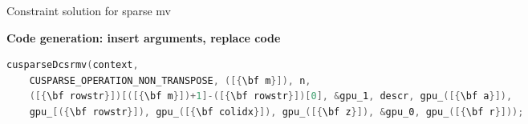 \caption{Constraint solution for sparse mv}
\label{fig:spmvexample2}

\centering
\vspace{0.0em}
{\centering
\begin{minipage}{0.05\linewidth}
\vspace{0pt}
\centering
{}
\end{minipage}
\begin{minipage}{\linewidth}
\centering
\textbf{Code generation: insert arguments, replace code}
\end{minipage}
\begin{minipage}{0.05\linewidth}
\vspace{0pt}
\centering
{}
\end{minipage}
}


\begin{lstlisting}[language=C, basicstyle=\linespread{0.75}\small\ttfamily,
                   label={fig:spmvexample3}, caption={Generated function call to cuSPARSE}]
cusparseDcsrmv(context,
    CUSPARSE_OPERATION_NON_TRANSPOSE, ([{\bf m}]), n,
    ([{\bf rowstr}])[([{\bf m}])+1]-([{\bf rowstr}])[0], &gpu_1, descr, gpu_([{\bf a}]),
    gpu_[({\bf rowstr}]), gpu_([{\bf colidx}]), gpu_([{\bf z}]), &gpu_0, gpu_([{\bf r}]));
\end{lstlisting}
\vspace{-0.287cm}